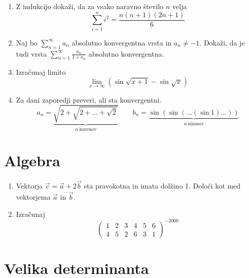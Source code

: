 \documentclass[a4paper,12pt]{article}
\begin{document}
\begin{enumerate}
\item
Z indukcijo dokaži, da za vsako naravno število \(n\) velja
\[
\sum_{i=1}^{n} i^2 = \frac{n(n+1)(2n+1)}{6}
\]

\item
Naj bo \(\sum_{n=1}^{\infty} a_n\) absolutno konvergentna vrsta in \(a_n \ne -1\).
Dokaži, da je tudi vrsta \(\sum_{n=1}^\infty \frac{a_n}{1+a_n}\)
absolutno konvergentna.

\item
Izračunaj limito
\[
\lim_{x\to\infty} (\sin \sqrt{x+1} - \sin \sqrt{x})
\]

\item
Za dani zaporedji preveri, ali sta konvergentni.
\[
a_n = \underbrace{\sqrt{2+\sqrt{2+\dots+\sqrt{2}}}}_{n~\text{korenov}}
\qquad
b_n = \underbrace{\sin(\sin(\dots(\sin 1)\dots))}_{n~\text{sinusov}}
\]
\end{enumerate}

\section*{Algebra}

\begin{enumerate}
\item
Vektorja \(\vec{c} = \vec{a} + 2\vec{b}\)
sta pravokotna in imata dolžino 1. Določi kot med vektorjema \(\vec{a}\) in \(\vec{b}\).

\item
Izračunaj
\[
\begin{pmatrix}
1 & 2 & 3 & 4 & 5 & 6 \\
4 & 5 & 2 & 6 & 3 & 1
\end{pmatrix}^{-2000}
\]
\end{enumerate}

\section*{Velika determinanta}
\end{document}
